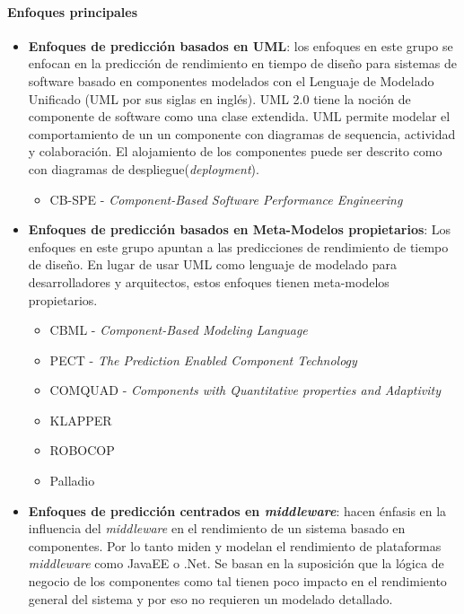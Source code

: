 \documentclass[11pt, twoside]{report}
\begin{document}
\paragraph{Enfoques principales}
\begin{itemize}
    \item \textbf{Enfoques de predicción basados en UML}: los enfoques en este grupo se enfocan en la predicción de rendimiento en tiempo de diseño para sistemas de software basado en componentes modelados con el Lenguaje de Modelado Unificado (UML por sus siglas en inglés). UML 2.0 tiene la noción de componente de software como una clase extendida. UML permite modelar el comportamiento de un un componente con diagramas de sequencia, actividad y colaboración. El alojamiento de los componentes puede ser descrito como con diagramas de despliegue(\emph{deployment}).     
    \begin{itemize}
        \item CB-SPE - \emph{Component-Based Software Performance Engineering} 
    \end{itemize}
    \item \textbf{Enfoques de predicción basados en Meta-Modelos propietarios}: Los enfoques en este grupo apuntan a las predicciones de rendimiento de tiempo de diseño. En lugar de usar UML como lenguaje de modelado para desarrolladores y arquitectos, estos enfoques tienen meta-modelos propietarios.
    \begin{itemize}
        \item CBML - \emph{Component-Based Modeling Language}
        \item PECT - \emph{The Prediction Enabled Component Technology}
        \item COMQUAD - \emph{Components with Quantitative properties and Adaptivity}
        \item KLAPPER
        \item ROBOCOP
        \item Palladio        
    \end{itemize}
    \item \textbf{Enfoques de predicción centrados en \emph{middleware}}: hacen énfasis en la influencia del \emph{middleware} en el rendimiento de un sistema basado en componentes. Por lo tanto miden y modelan el rendimiento de plataformas \emph{middleware} como JavaEE o .Net. Se basan en la suposición que la lógica de negocio de los componentes como tal tienen poco impacto en el rendimiento general del sistema y por eso no requieren un modelado detallado.

\end{itemize}
\end{document}
